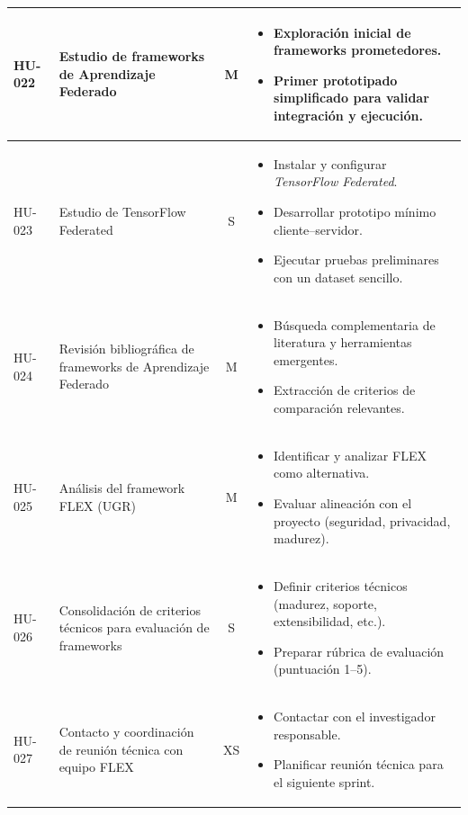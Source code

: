 \documentclass{report}
\begin{document}
\begin{table}[H]
\begin{tabular}{|l|p{4.2cm}|c|p{6.2cm}|}
HU-022 &
Estudio de frameworks de Aprendizaje Federado &
M &
\begin{itemize}\setlength\itemsep{0.2em}
  \item Exploración inicial de frameworks prometedores.
  \item Primer prototipado simplificado para validar integración y ejecución.
\end{itemize}
\\ \hline

HU-023 &
Estudio de TensorFlow Federated &
S &
\begin{itemize}\setlength\itemsep{0.2em}
  \item Instalar y configurar \textit{TensorFlow Federated}.
  \item Desarrollar prototipo mínimo cliente--servidor.
  \item Ejecutar pruebas preliminares con un dataset sencillo.
\end{itemize}
\\ \hline

HU-024 &
Revisión bibliográfica de frameworks de Aprendizaje Federado &
M &
\begin{itemize}\setlength\itemsep{0.2em}
  \item Búsqueda complementaria de literatura y herramientas emergentes.
  \item Extracción de criterios de comparación relevantes.
\end{itemize}
\\ \hline

HU-025 &
Análisis del framework FLEX (UGR) &
M &
\begin{itemize}\setlength\itemsep{0.2em}
  \item Identificar y analizar FLEX como alternativa.
  \item Evaluar alineación con el proyecto (seguridad, privacidad, madurez).
\end{itemize}
\\ \hline

HU-026 &
Consolidación de criterios técnicos para evaluación de frameworks &
S &
\begin{itemize}\setlength\itemsep{0.2em}
  \item Definir criterios técnicos (madurez, soporte, extensibilidad, etc.).
  \item Preparar rúbrica de evaluación (puntuación 1--5).
\end{itemize}
\\ \hline

HU-027 &
Contacto y coordinación de reunión técnica con equipo FLEX &
XS &
\begin{itemize}\setlength\itemsep{0.2em}
  \item Contactar con el investigador responsable.
  \item Planificar reunión técnica para el siguiente sprint.
\end{itemize}
\\ \hline


\end{tabular}
\end{table}
\end{document}
